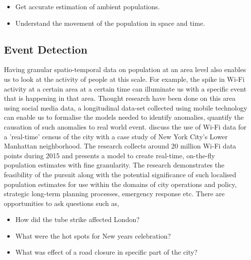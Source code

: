 \begin{itemize}
  \setlength{\itemindent}{2em}
  \itemsep-0.25em
  \item Get accurate estimation of ambient populations.
  \item Understand the movement of the population in space and time.
\end{itemize}

\subsection{Event Detection}

Having granular spatio-temporal data on population at an area level also enables us to look at the activity of people at this scale.
For example, the spike in Wi-Fi activity at a certain area at a certain time can illuminate us with a specific event that is happening in that area.
Thought research have been done on this area using social media data, a longitudinal data-set collected using mobile technology can enable us to formalise the models needed to identify anomalies, quantify the causation of such anomalies to real world event.
\citep{kontokosta2016} discuss the use of Wi-Fi data for a 'real-time' census of the city with a case study of New York City's Lower Manhattan neighborhood.
The research collects around 20 million Wi-Fi data points during 2015 and presents a model to create real-time, on-the-fly population estimates with fine granularity.
The research demonstrates the feasibility of the pursuit along with the potential significance of such localised population estimates for use within the domains of city operations and policy, strategic long-term planning processes, emergency response etc.
There are opportunities to ask questions such as,


\begin{itemize}
  \setlength{\itemindent}{2em}
  \itemsep-0.25em
  \item How did the tube strike affected London?
  \item What were the hot spots for New years celebration?
  \item What was effect of a road closure in specific part of the city?
\end{itemize}

